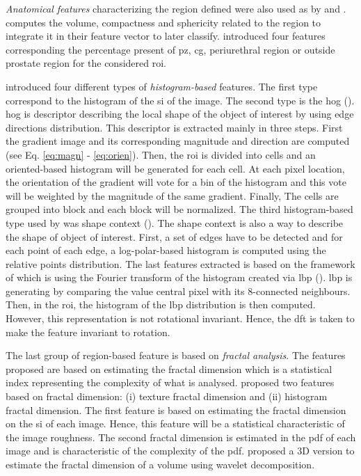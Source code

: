 \begin{enumerate}[leftmargin=*]
\textit{Anatomical features} characterizing the region defined were also used as by \cite{Litjens2012} and \cite{Matulewicz2013}. \cite{Litjens2012} computes the volume, compactness and sphericity related to the region to integrate it in their feature vector to later classify. \cite{Matulewicz2013} introduced four features corresponding the percentage present of \ac{pz}, \ac{cg}, periurethral region or outside prostate region for the considered \ac{roi}.

\cite{Liu2013} introduced four different types of \textit{histogram-based} features. The first type correspond to the histogram of the \ac{si} of the image. The second type is the \ac{hog} (\cite{Dalal2005}). \Ac{hog} is descriptor describing the local shape of the object of interest by using edge directions distribution. This descriptor is extracted mainly in three steps. First the gradient image and its corresponding magnitude and direction are computed (see Eq. \ref{eq:magn} - \ref{eq:orien}). Then, the \ac{roi} is divided into cells and an oriented-based histogram will be generated for each cell. At each pixel location, the orientation of the gradient will vote for a bin of the histogram and this vote will be weighted by the magnitude of the same gradient. Finally, The cells are grouped into block and each block will be normalized. The third histogram-based type used by \cite{Liu2013} was shape context (\cite{Belongie2002}). The shape context is also a way to describe the shape of object of interest. First, a set of edges have to be detected and for each point of each edge, a log-polar-based histogram is computed using the relative points distribution. The last features extracted is based on the framework of \cite{Zhao2012} which is using the Fourier transform of the histogram created via \ac{lbp} (\cite{Ojala1996}). \Ac{lbp} is generating by comparing the value central pixel with its 8-connected neighbours. Then, in the \ac{roi}, the histogram of the \ac{lbp} distribution is then computed. However, this representation is not rotational invariant. Hence, the \ac{dft} is taken to make the feature invariant to rotation.

The last group of region-based feature is based on \textit{fractal analysis}. The features proposed are based on estimating the fractal dimension which is a statistical index representing the complexity of what is analysed. \cite{Lv2009} proposed two features based on fractal dimension: (i) texture fractal dimension and (ii) histogram fractal dimension. The first feature is based on estimating the fractal dimension on the \ac{si} of each image. Hence, this feature will be a statistical characteristic of the image roughness. The second fractal dimension is estimated in the \ac{pdf} of each image and is characteristic of the complexity of the \ac{pdf}. \cite{Lopes2011} proposed a 3D version to estimate the fractal dimension of a volume using wavelet decomposition.
\end{enumerate}

